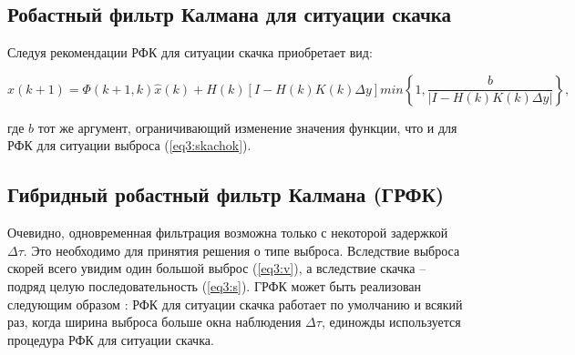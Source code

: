 \subsection{Робастный фильтр Калмана для ситуации скачка} \label{sect3_5_2}

Следуя рекомендации \cite{RobustFilter} РФК для ситуации скачка приобретает вид:

\begin{equation}\label{eq3:vibros}
\hat{x}(k+1)=\Phi(k+1,k)\hat{x}(k)+H(k)[I-H(k)K(k)\Delta y] min\left\{1,\frac{b}{|I-H(k)K(k)\Delta y|}\right\},
\end{equation}

\noindent где $b$ тот же аргумент, ограничивающий изменение значения функции, что и для РФК для ситуации выброса (\ref{eq3:skachok}).

\subsection{Гибридный робастный фильтр Калмана (ГРФК)} \label{sect3_5_3}

Очевидно, одновременная фильтрация возможна только с некоторой задержкой $\Delta \tau$. Это необходимо для принятия решения о типе выброса. Вследствие выброса скорей всего увидим один большой выброс (\ref{eq3:v}), а вследствие скачка – подряд целую последовательность (\ref{eq3:s}). ГРФК может быть реализован следующим образом \cite{RobustFilter}: РФК для ситуации скачка работает по умолчанию и всякий раз, когда ширина выброса больше окна наблюдения $\Delta \tau$, единожды используется процедура РФК для ситуации скачка.


